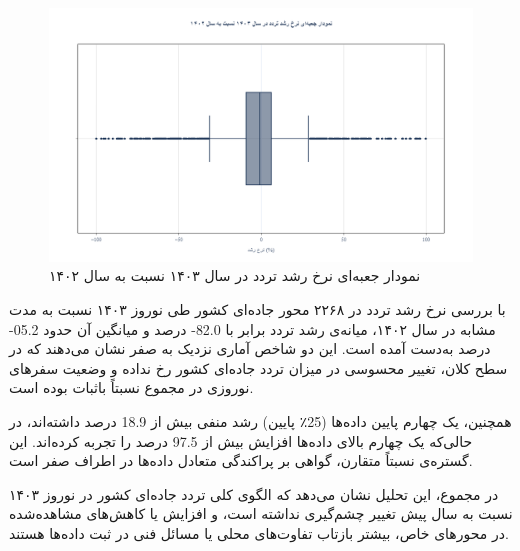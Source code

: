 \documentclass[a4paper, 12pt]{article}
\begin{document}
\begin{figure}[htbp]
    \centering
    \includegraphics[width=1\textwidth]{growth.png}
    \caption{نمودار جعبه‌ای نرخ رشد تردد در سال ۱۴۰۳ نسبت به سال ۱۴۰۲}
\end{figure}


با بررسی نرخ رشد تردد در ۲۲۶۸ محور جاده‌ای کشور طی نوروز ۱۴۰۳ نسبت به مدت مشابه در سال ۱۴۰۲، میانه‌ی رشد تردد برابر با
82.0-
درصد و میانگین آن حدود
05.2-
درصد به‌دست آمده است. این دو شاخص آماری نزدیک به صفر نشان می‌دهند که در سطح کلان، تغییر محسوسی در میزان تردد جاده‌ای کشور رخ نداده و وضعیت سفرهای نوروزی در مجموع نسبتاً باثبات بوده است.

همچنین، یک چهارم پایین داده‌ها (25٪ پایین) رشد منفی بیش از
18.9
درصد داشته‌اند، در حالی‌که یک چهارم بالای داده‌ها افزایش بیش از
97.5
درصد
را تجربه کرده‌اند. این گستره‌ی نسبتاً متقارن، گواهی بر پراکندگی متعادل داده‌ها در اطراف صفر است.

در مجموع، این تحلیل نشان می‌دهد که الگوی کلی تردد جاده‌ای کشور در نوروز ۱۴۰۳ نسبت به سال پیش تغییر چشم‌گیری نداشته است، و افزایش یا کاهش‌های مشاهده‌شده در محورهای خاص، بیشتر بازتاب تفاوت‌های محلی یا مسائل فنی در ثبت داده‌ها هستند.
\end{document}
